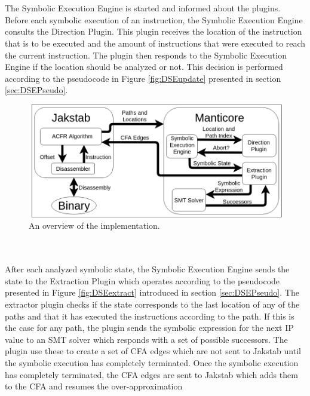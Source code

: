 \documentclass{kththesis}
\begin{document}
\\ \\
The Symbolic Execution Engine is started and informed about the plugins. Before each symbolic execution of an instruction, the Symbolic Execution Engine consults the Direction Plugin. This plugin receives the location of the instruction that is to be executed and the amount of instructions that were executed to reach the current instruction. The plugin then responds to the Symbolic Execution Engine if the location should be analyzed or not. This decision is performed according to the pseudocode in Figure \ref{fig:DSEupdate} presented in section \ref{sec:DSEPseudo}. 
\begin{figure}[!t]
    \centering
    \includegraphics[scale=0.41]{Images/ImplementationOverview.png}
    \caption{An overview of the implementation.}
    \label{fig:implementationOverview}
\end{figure}
\\ \\
After each analyzed symbolic state, the Symbolic Execution Engine sends the state to the Extraction Plugin which operates according to the pseudocode presented in Figure \ref{fig:DSEextract} introduced in section \ref{sec:DSEPseudo}. The extractor plugin checks if the state corresponds to the last location of any of the paths and that it has executed the instructions according to the path. If this is the case for any path, the plugin sends the symbolic expression for the next IP value to an SMT solver which responds with a set of possible successors. The plugin use these to create a set of CFA edges which are not sent to Jakstab until the symbolic execution has completely terminated. Once the symbolic execution has completely terminated, the CFA edges are sent to Jakstab which adds them to the CFA and resumes the over-approximation
\end{document}
